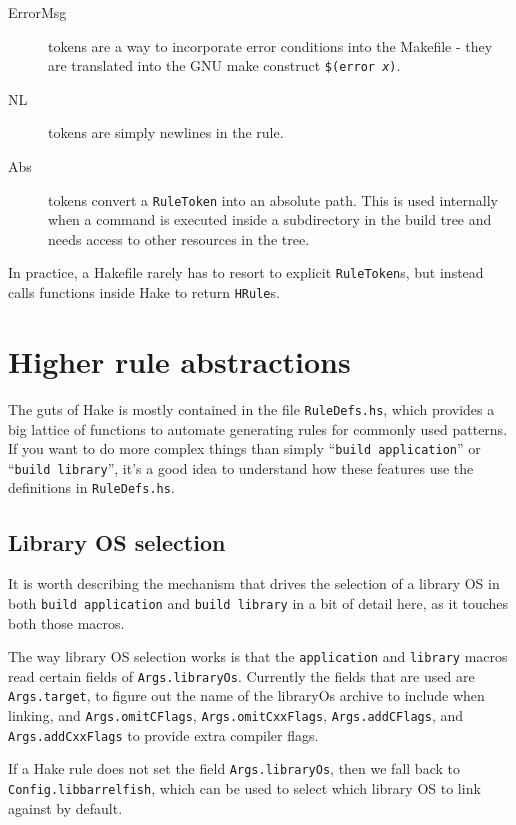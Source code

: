 \documentclass[a4paper,twoside]{report} %
\begin{document}
\begin{description}
\item[ErrorMsg] tokens are a way to incorporate error conditions into
  the Makefile - they are translated into the GNU make construct
  \texttt{\$(error \textit{x})}.

\item[NL] tokens are simply newlines in the rule.

\item[Abs] tokens convert a \texttt{RuleToken} into an absolute path.
  This is used internally when a command is executed inside a subdirectory
  in the build tree and needs access to other resources in the tree.

\end{description}

In practice, a Hakefile rarely has to resort to explicit
\texttt{RuleToken}s, but instead calls functions inside Hake to return
\texttt{HRule}s.


\section{Higher rule abstractions}

The guts of Hake is mostly contained in the file \texttt{RuleDefs.hs},
which provides a big lattice of functions to automate generating
rules for commonly used patterns.  If you want to do more complex
things than simply ``\texttt{build application}'' or ``\texttt{build
  library}'', it's a good idea to understand how these features use
the definitions in \texttt{RuleDefs.hs}.

\subsection{Library OS selection}

It is worth describing the mechanism that drives the selection of a library OS
in both \texttt{build application} and \texttt{build library} in a bit of
detail here, as it touches both those macros.

The way library OS selection works is that the \texttt{application} and
\texttt{library}  macros read certain fields of \verb|Args.libraryOs|.
Currently the fields that are used are \verb|Args.target|, to figure out the
name of the libraryOs archive to include when linking, and
\verb|Args.omitCFlags|, \verb|Args.omitCxxFlags|, \verb|Args.addCFlags|, and
\verb|Args.addCxxFlags| to provide extra compiler flags.

If a Hake rule does not set the field \verb|Args.libraryOs|, then we fall back
to \verb|Config.libbarrelfish|, which can be used to select which library OS
to link against by default.
\end{document}

